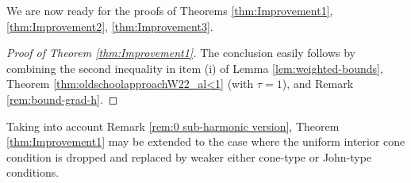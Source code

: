 \documentclass[a4paper,10pt]{amsart}
\numberwithin{equation}{section}
\begin{document}
%
%
%
%	
%
%	
%	
%	
%	
%	
%
%

We are now ready for the proofs of Theorems \ref{thm:Improvement1}, \ref{thm:Improvement2}, \ref{thm:Improvement3}.


\begin{proof}[Proof of Theorem \ref{thm:Improvement1}]
	The conclusion easily follows by combining the second inequality in item (i) of Lemma \ref{lem:weighted-bounds},
Theorem \ref{thm:oldschoolapproachW22_al<1} (with $\tau=1$), and Remark \ref{rem:bound-grad-h}.
\end{proof}

\begin{rem}\label{rem:John extension}
	{\rm 
	Taking into account Remark \ref{rem:0 sub-harmonic version}, Theorem \ref{thm:Improvement1} may be extended to the case where the uniform interior cone condition is dropped and replaced by weaker either cone-type or John-type conditions. 
}
\end{rem}
\end{document}
